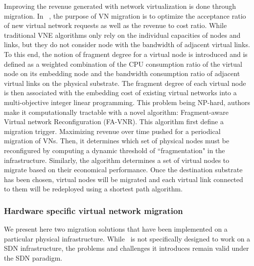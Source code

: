 Improving the revenue generated with network virtualization is done through migration.
In ~\cite{fragment-Liu2018}, the purpose of VN migration is to optimize the acceptance ratio of new virtual network requests as well as the revenue to cost ratio.
While traditional VNE algorithms only rely on the individual capacities of nodes and links, but they do not consider node with the bandwidth of adjacent virtual links.
To this end, the notion of fragment degree for a virtual node is introduced and is defined as a weighted combination of the CPU consumption ratio of the virtual node on its embedding node and the bandwidth consumption ratio of adjacent virtual links on the physical substrate.
The fragment degree of each virtual node is then associated with the embedding cost of existing virtual networks into a multi-objective integer linear programming. This problem being NP-hard, authors make it computationally tractable with a novel algorithm: Fragment-aware Virtual network Reconfiguration (FA-VNR).
This algorithm first define a migration trigger. Maximizing revenue over time pushed for a periodical migration of VNs.
Then, it determines which set of physical nodes must be reconfigured by computing a dynamic threshold of ``fragmentation" in the infrastructure.
Similarly, the algorithm determines a set of virtual nodes to migrate based on their economical performance.
Once the destination substrate has been chosen, virtual nodes will be migrated and each virtual link connected to them will be redeployed using a shortest path algorithm.

\subsubsection{Hardware specific virtual network migration}
We present here two migration solutions that have been implemented on a particular physical infrastructure.
While~\cite{Lo2014} is not specifically designed to work on a SDN infrastructure, the problems and challenges it introduces remain valid under the SDN paradigm.

